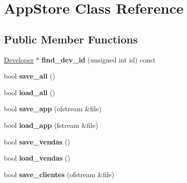 \hypertarget{class_app_store}{\section{App\+Store Class Reference}
\label{class_app_store}
}
\subsection*{Public Member Functions}
\begin{DoxyCompactItemize}
\item 
\hypertarget{class_app_store_a846404e97e4d559aafdb52be79cea7c7}{\hyperlink{class_developer}{Developer} $\ast$ {\bfseries find\+\_\+dev\+\_\+id} (unsigned int id) const }\label{class_app_store_a846404e97e4d559aafdb52be79cea7c7}

\item 
\hypertarget{class_app_store_a6f08f038a3407eac967198bb2c66d503}{bool {\bfseries save\+\_\+all} ()}\label{class_app_store_a6f08f038a3407eac967198bb2c66d503}

\item 
\hypertarget{class_app_store_a57a6ca1ab540c2670b92987252bee1b9}{bool {\bfseries load\+\_\+all} ()}\label{class_app_store_a57a6ca1ab540c2670b92987252bee1b9}

\item 
\hypertarget{class_app_store_a12ab54d48ce4d709971823127eb92408}{bool {\bfseries save\+\_\+app} (ofstream \&file)}\label{class_app_store_a12ab54d48ce4d709971823127eb92408}

\item 
\hypertarget{class_app_store_a4b4a37404b10df2303a8f95d6c2697b4}{bool {\bfseries load\+\_\+app} (fstream \&file)}\label{class_app_store_a4b4a37404b10df2303a8f95d6c2697b4}

\item 
\hypertarget{class_app_store_a962af0949df52b478dd6b397f94d65e1}{bool {\bfseries save\+\_\+vendas} ()}\label{class_app_store_a962af0949df52b478dd6b397f94d65e1}

\item 
\hypertarget{class_app_store_adcc5adb4715c96650c6fbd19415b4911}{bool {\bfseries load\+\_\+vendas} ()}\label{class_app_store_adcc5adb4715c96650c6fbd19415b4911}

\item 
\hypertarget{class_app_store_a347e9f40006f1b33ff4875b7338aa8c5}{bool {\bfseries save\+\_\+clientes} (ofstream \&file)}\label{class_app_store_a347e9f40006f1b33ff4875b7338aa8c5}


\end{DoxyCompactItemize}
